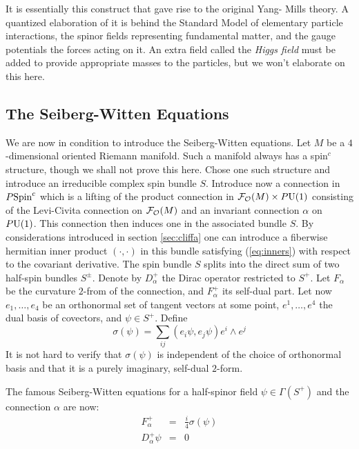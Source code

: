 \documentclass[12pt,titlepage]{article}
\def\cF{{\cal F}}
\def\cO{{\cal O}}
\def\Spin{\hbox{Spin}}
\def\U{\hbox{U}}
\begin{document}
It is essentially this construct that gave rise to the original Yang-
Mills theory. A quantized elaboration of it is behind the Standard Model of
elementary particle interactions, the spinor fields representing
fundamental matter, and the gauge potentials the forces acting on it. An
extra field called the {\em Higgs field\/} 
%
must be added to provide appropriate masses to the particles, but we
won't elaborate on this here.



\subsection{The Seiberg-Witten Equations}
We are now in condition to introduce the Seiberg-Witten equations. 
Let \(M\) 
be a \(4\)-dimensional oriented Riemann manifold. Such a manifold 
always has 
a spin\({}^c\) structure, though we shall not prove this here. 
Chose one such 
structure and introduce an irreducible complex spin bundle \(S\).  
Introduce 
now a connection in \(P\Spin^c\) which is a lifting of the 
product connection 
in \(\cF_{\cO}(M)\times P\U(1)\) consisting of the Levi-Civita connection on 
\(\cF_{\cO}(M)\) and an invariant connection \(\alpha\) on \(P\U(1)\). 
This connection then induces one in the 
associated bundle \(S\). By considerations introduced in section 
\ref{sec:cliffa} one can introduce a fiberwise hermitian inner product 
\((\cdot, \cdot)\) in this bundle satisfying (\ref{eq:inners}) with respect 
to the  covariant derivative. 
 The spin bundle \(S\)
splits into the direct sum of two half-spin bundles \(S^{\pm}\). 
Denote 
by \(D_\alpha^+\) the Dirac operator restricted to \(S^+\). Let \(F_\alpha\) 
be the curvature \(2\)-from  of the connection, and \(F_\alpha^+\) 
its self-dual part.
Let now \(e_1,\dots,e_4\) be an 
orthonormal set of tangent vectors at some point, 
\(e^1,\dots,e^4\) the dual 
basis of covectors, and \(\psi \in S^+\). Define
\[
\sigma(\psi)=\sum_{ij}(e_i\psi,e_j\psi)e^i\wedge e^j
\]%
It is not hard to verify that \(\sigma(\psi)\) is independent of the choice 
of orthonormal basis and that it is a purely imaginary,  
self-dual \(2\)-form. 

 The famous Seiberg-Witten equations for a half-spinor field 
\(\psi\in\Gamma(S^+)\) and the connection \(\alpha\) are now:
\begin{eqnarray}%
F_\alpha^+ &=& \frac{i}{4}\sigma(\psi)\\
D_\alpha^+\psi &=& 0
\end{eqnarray}%
\end{document}
